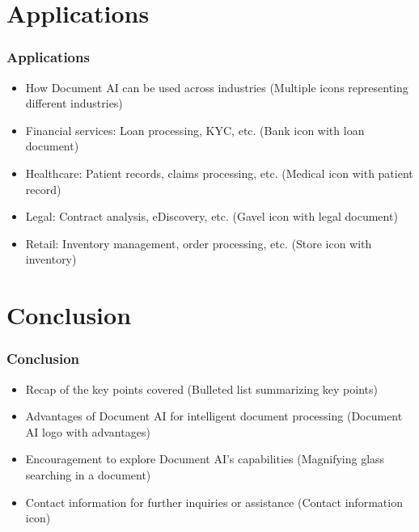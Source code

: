 \section{Applications}

\begin{frame}[fragile]\frametitle{Applications}
  \begin{itemize}
    \item How Document AI can be used across industries (Multiple icons representing different industries)
    \item Financial services: Loan processing, KYC, etc. (Bank icon with loan document)
    \item Healthcare: Patient records, claims processing, etc. (Medical icon with patient record)
    \item Legal: Contract analysis, eDiscovery, etc. (Gavel icon with legal document)
    \item Retail: Inventory management, order processing, etc. (Store icon with inventory)
  \end{itemize}
\end{frame}

\section{Conclusion}

\begin{frame}[fragile]\frametitle{Conclusion}
  \begin{itemize}
    \item Recap of the key points covered (Bulleted list summarizing key points)
    \item Advantages of Document AI for intelligent document processing (Document AI logo with advantages)
    \item Encouragement to explore Document AI's capabilities (Magnifying glass searching in a document)
    \item Contact information for further inquiries or assistance (Contact information icon)
  \end{itemize}
\end{frame}

